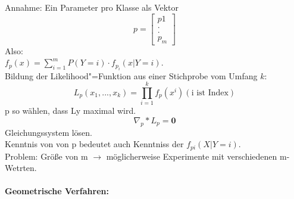 \documentclass[a4paper,12pt]{scrreprt}
\newcommand{\Nb}[1]{\textbf{#1}}
\begin{document}
Annahme: Ein Parameter pro Klasse als Vektor
$$p=\begin{bmatrix}p1\\.\\.\\p_m\end{bmatrix}$$
Also:\\ $f_p(x)=\sum\limits^m_{i=1}P(Y=i)\cdot f_{p_i}(x|Y=i)$.\\
Bildung der Likelihood"=Funktion aus einer Stichprobe vom Umfang $k$:
$$L_p(x_1,...,x_k)=\prod\limits^k_{i=1}f_{p}(x^i) (\text{i ist Index})$$
p so wählen, dass Ly maximal wird.\\
$$ \nabla_p * L_p = \mathbf{0}$$
Gleichungssystem lösen.\\
Kenntnis von von p bedeutet auch Kenntniss der $f_{pi}(X|Y=i)$.\\
Problem: Größe von m $\rightarrow $ möglicherweise Experimente mit verschiedenen m-Wetrten.\\
\\
\Nb{Geometrische Verfahren:}
\end{document}
